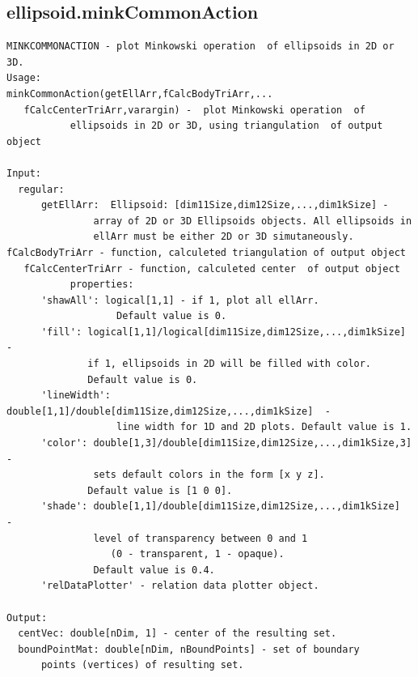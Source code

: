\documentclass[letterpaper,10pt,english]{sphinxmanual}
\begin{document}
\subsection{ellipsoid.minkCommonAction}
\label{chap_functions:ellipsoid-minkcommonaction}
\begin{Verbatim}[commandchars=\\\{\}]
MINKCOMMONACTION - plot Minkowski operation  of ellipsoids in 2D or 3D.
Usage:
minkCommonAction(getEllArr,fCalcBodyTriArr,...
   fCalcCenterTriArr,varargin) -  plot Minkowski operation  of
           ellipsoids in 2D or 3D, using triangulation  of output object

Input:
  regular:
      getEllArr:  Ellipsoid: [dim11Size,dim12Size,...,dim1kSize] -
               array of 2D or 3D Ellipsoids objects. All ellipsoids in
               ellArr must be either 2D or 3D simutaneously.
fCalcBodyTriArr - function, calculeted triangulation of output object
   fCalcCenterTriArr - function, calculeted center  of output object
           properties:
      'shawAll': logical[1,1] - if 1, plot all ellArr.
                   Default value is 0.
      'fill': logical[1,1]/logical[dim11Size,dim12Size,...,dim1kSize]  -
              if 1, ellipsoids in 2D will be filled with color.
              Default value is 0.
      'lineWidth': double[1,1]/double[dim11Size,dim12Size,...,dim1kSize]  -
                   line width for 1D and 2D plots. Default value is 1.
      'color': double[1,3]/double[dim11Size,dim12Size,...,dim1kSize,3] -
               sets default colors in the form [x y z].
              Default value is [1 0 0].
      'shade': double[1,1]/double[dim11Size,dim12Size,...,dim1kSize]  -
               level of transparency between 0 and 1
                  (0 - transparent, 1 - opaque).
               Default value is 0.4.
      'relDataPlotter' - relation data plotter object.

Output:
  centVec: double[nDim, 1] - center of the resulting set.
  boundPointMat: double[nDim, nBoundPoints] - set of boundary
      points (vertices) of resulting set.
\end{Verbatim}
\end{document}
